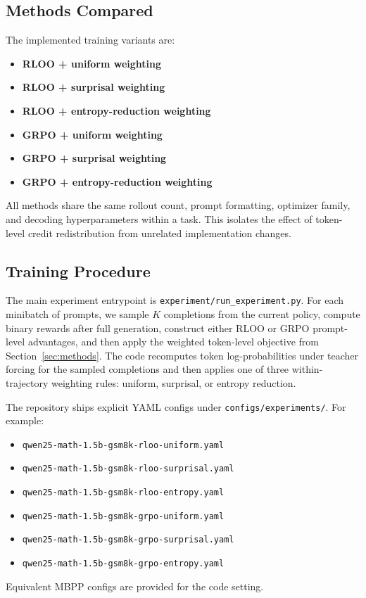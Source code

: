 \subsection{Methods Compared}

The implemented training variants are:
\begin{itemize}
    \item \textbf{RLOO + uniform weighting}
    \item \textbf{RLOO + surprisal weighting}
    \item \textbf{RLOO + entropy-reduction weighting}
    \item \textbf{GRPO + uniform weighting}
    \item \textbf{GRPO + surprisal weighting}
    \item \textbf{GRPO + entropy-reduction weighting}
\end{itemize}
All methods share the same rollout count, prompt formatting, optimizer family, and decoding hyperparameters within a task. This isolates the effect of token-level credit redistribution from unrelated implementation changes.

\subsection{Training Procedure}

The main experiment entrypoint is \texttt{experiment/run\_experiment.py}. For each minibatch of prompts, we sample $K$ completions from the current policy, compute binary rewards after full generation, construct either RLOO or GRPO prompt-level advantages, and then apply the weighted token-level objective from Section~\ref{sec:methods}. The code recomputes token log-probabilities under teacher forcing for the sampled completions and then applies one of three within-trajectory weighting rules: uniform, surprisal, or entropy reduction.

The repository ships explicit YAML configs under \texttt{configs/experiments/}. For example:
\begin{itemize}
    \item \texttt{qwen25-math-1.5b-gsm8k-rloo-uniform.yaml}
    \item \texttt{qwen25-math-1.5b-gsm8k-rloo-surprisal.yaml}
    \item \texttt{qwen25-math-1.5b-gsm8k-rloo-entropy.yaml}
    \item \texttt{qwen25-math-1.5b-gsm8k-grpo-uniform.yaml}
    \item \texttt{qwen25-math-1.5b-gsm8k-grpo-surprisal.yaml}
    \item \texttt{qwen25-math-1.5b-gsm8k-grpo-entropy.yaml}
\end{itemize}
Equivalent MBPP configs are provided for the code setting.

